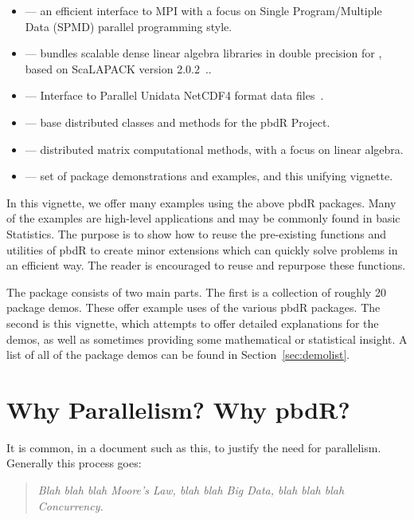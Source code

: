 \begin{itemize}
 \item {} --- an efficient interface to MPI with a focus on Single Program/Multiple Data (SPMD) parallel programming style.
 \item {} --- bundles scalable dense linear algebra libraries in double precision for , based on ScaLAPACK version 2.0.2~\citep{slug}..
 \item {} --- Interface to Parallel Unidata NetCDF4 format data files~\citep{netcdf}.
 \item {} --- base distributed classes and methods for the pbdR Project.
 \item {} --- distributed matrix computational methods, with a focus on linear algebra.
 \item {} --- set of package demonstrations and examples, and this unifying vignette.
\end{itemize}

In this vignette, we offer many examples using the above pbdR packages.  Many of the examples are high-level
applications and may be commonly found in basic Statistics.  The purpose is to show how to reuse the pre-existing functions and utilities of pbdR to create minor extensions which can quickly solve problems in an efficient way.  The reader is encouraged to reuse and repurpose these functions.

The  package consists of two main parts.  The first is a collection of roughly 20 package demos.  These offer example uses of the various pbdR packages.  The second is this vignette, which attempts to offer detailed explanations for the demos, as well as sometimes providing some mathematical or statistical insight.  A list of all of the package demos can be found in Section~\ref{sec:demolist}.



\section{Why Parallelism?  Why pbdR?}

It is common, in a document such as this, to justify the need for parallelism.  Generally this process goes:

\begin{quote}
\emph{
Blah blah blah Moore's Law, blah blah Big Data, blah blah blah Concurrency.
}
\end{quote}

